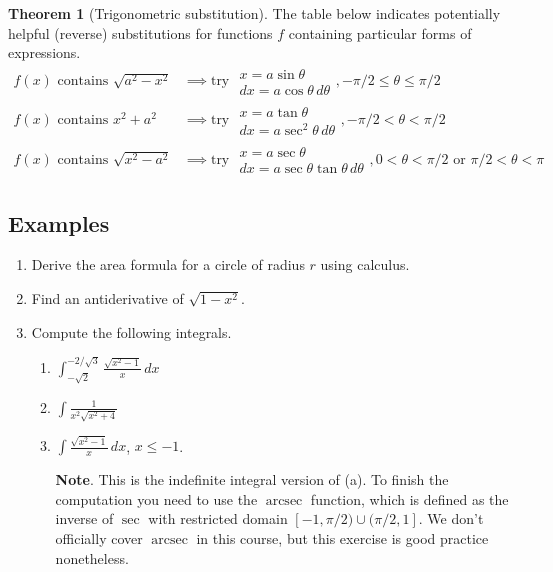 \documentclass[11pt]{article}
\theoremstyle{definition}
\theoremstyle{named}
\newtheorem*{namedtheorem}{Theorem}
\numberwithin{myalgctr}{section}
\begin{document}
\begin{namedtheorem}[Trigonometric substitution]
The table below indicates potentially helpful (reverse) substitutions for functions $f$ containing particular forms of expressions.
\begin{align*}
  f(x) \text{ contains } \sqrt{a^2-x^2}&\implies \text{try } \begin{array}{c}
    x=a\sin\theta\\
    dx=a\cos\theta\, d\theta
  \end{array}, -\pi/2\leq\theta\leq\pi/2\\
  f(x) \text{ contains } x^2+a^2 &\implies \text{try } \begin{array}{c}
    x=a\tan\theta\\
    dx=a\sec^2\theta\, d\theta
  \end{array}, -\pi/2<\theta< \pi/2\\
  f(x) \text{ contains } \sqrt{x^2-a^2} &\implies \text{try } \begin{array}{c}
    x=a\sec\theta\\
    dx=a\sec\theta\tan\theta\, d\theta
  \end{array}, 0<\theta< \pi/2 \text{ or } \pi/2<\theta<\pi
\end{align*}

\end{namedtheorem}
\subsection*{Examples}

\begin{enumerate}
  \item Derive the area formula for a circle of radius $r$ using calculus.
  \item Find an antiderivative of $\sqrt{1-x^2}$.
  \item Compute the following integrals.
  \begin{enumerate}
    \item $\displaystyle\int_{-\sqrt{2}}^{-2/\sqrt{3}}\frac{\sqrt{x^2-1}}{x}\, dx$
    \item $\displaystyle\int \frac{1}{x^2\sqrt{x^2+4}}$
    \item $\displaystyle\int \frac{\sqrt{x^2-1}}{x}\, dx$, $x\leq -1$.

    {\bf Note}. This is the indefinite integral version of (a). To finish the computation you need to use the $\operatorname{arcsec}$ function, which is defined as the inverse of $\sec$ with restricted domain $[-1,\pi/2)\cup (\pi/2,1]$. We don't officially cover $\operatorname{arcsec}$ in this course, but this exercise is good practice nonetheless.
  \end{enumerate}
\end{enumerate}
\end{document}
